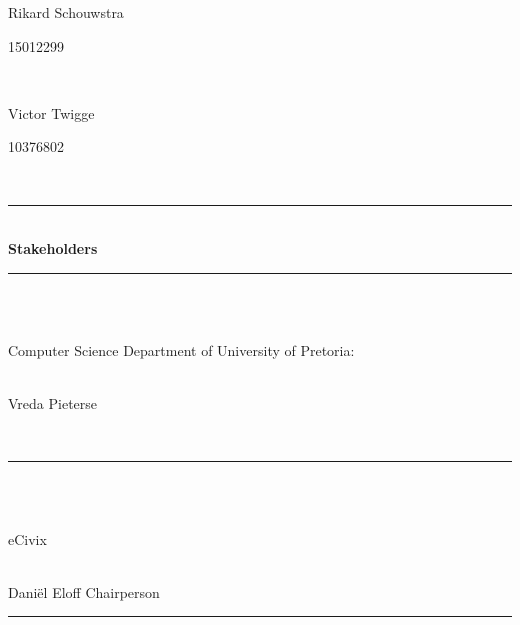 \begin{titlepage}
\begin{center}
		\begin{minipage}{0.4\textwidth}
			\begin{flushleft} \large
				Rikard Schouwstra
			\end{flushleft}
		\end{minipage}
		\begin{minipage}{0.4\textwidth}
			\begin{flushright} \large
				15012299
			\end{flushright}
		\end{minipage} \\[0.2cm]
		
		\begin{minipage}{0.4\textwidth}
			\begin{flushleft} \large
				Victor Twigge 
			\end{flushleft}
		\end{minipage}
		\begin{minipage}{0.4\textwidth}
			\begin{flushright} \large
				10376802
			\end{flushright}
		\end{minipage}\\[0.2cm]
		
		\rule{\linewidth}{0.5mm} \\[0.5cm] 
		{ \huge \bfseries Stakeholders}\\[0.3cm]	
		\rule{\linewidth}{0.2mm} \\[0.5cm] 
		\begin{minipage}{0.4\textwidth}
			\begin{flushleft} \large
				\emph{} \\
				Computer Science Department of University of Pretoria:
			\end{flushleft}
		\end{minipage}
		\begin{minipage}{0.4\textwidth}
			\begin{flushright} \large
				\emph{} \\
				Vreda Pieterse
			\end{flushright}
		\end{minipage}\\[0.2cm]

		\rule{\linewidth}{0.2mm} \\[0.5cm] 
		\begin{minipage}{0.4\textwidth}
			\begin{flushleft} \large
				\emph{} \\
				eCivix
			\end{flushleft}
		\end{minipage}
		\begin{minipage}{0.4\textwidth}
			\begin{flushright} \large
				\emph{} \\
				Daniël Eloff {Chairperson}
			\end{flushright}
		\end{minipage}
		\rule{\linewidth}{0.2mm} \\[0.5cm] 
		
	\end{center}
\end{titlepage}
